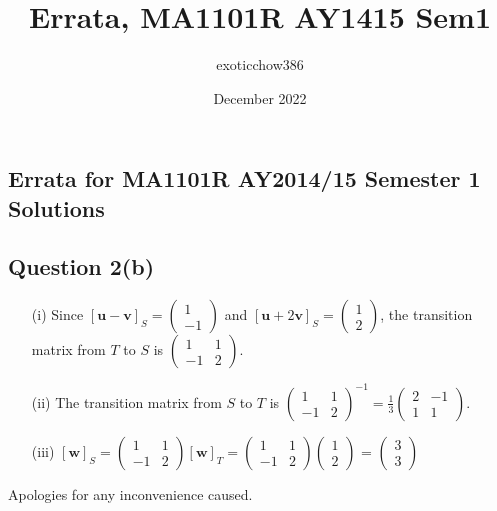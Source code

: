 \documentclass{article}
\title{Errata, MA1101R AY1415 Sem1}
\author{exoticchow386 }
\date{December 2022}
\begin{document}
\subsection*{Errata for MA1101R AY2014/15 Semester 1 Solutions\\
\\Question 2(b)}

\begin{itemize}
    \item[(i)] Since $[\mathbf{u}-\mathbf{v}]_S = \begin{pmatrix}1 \\ -1\end{pmatrix}
    $ and $[\mathbf{u}+2\mathbf{v}]_S = \begin{pmatrix}1\\2\end{pmatrix}
    $, the transition matrix from $T$ to $S$ is $\begin{pmatrix}1&1\\-1&2\end{pmatrix}$.
    \item[(ii)] The transition matrix from $S$ to $T$ is $\begin{pmatrix}1&1\\-1&2\end{pmatrix}^{-1}= \frac13\begin{pmatrix}2&-1\\1&1
    \end{pmatrix}$.
    \item[(iii)] $[\mathbf{w}]_S = \begin{pmatrix}1&1\\-1&2\end{pmatrix}[\mathbf{w}]_T = \begin{pmatrix}1&1\\-1&2\end{pmatrix}\begin{pmatrix}1\\2\end{pmatrix}$ = $\begin{pmatrix}3\\3\end{pmatrix}$
\end{itemize}



Apologies for any inconvenience caused.
\end{document}
